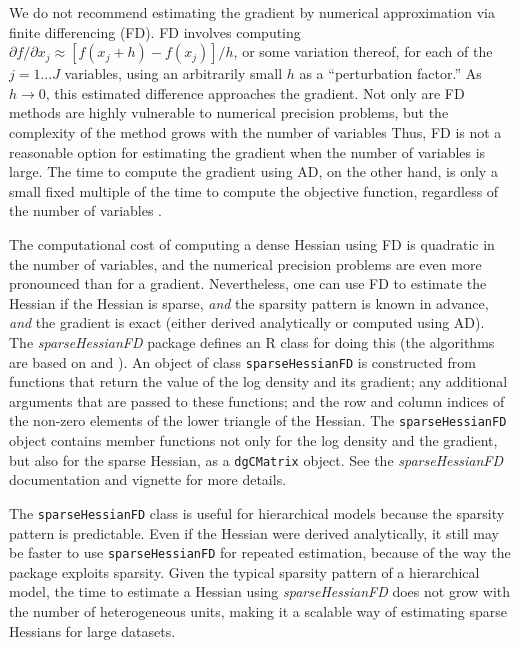 \documentclass[10pt]{article}\usepackage[]{graphicx}\usepackage[]{color}
\newcommand{\pkg}[1]{\emph{#1}}
\newcommand{\proglang}[1]{\textsf{#1}}
\newcommand{\class}[1]{\texttt{#1}}
\begin{document}
We do not recommend estimating the gradient by numerical approximation via finite
differencing (FD).  FD involves computing
$\partial f/\partial x_j\approx\left[f\left(x_j+h\right)-f\left(x_j\right)\right]/h$,
or some variation thereof, for each of the $j=1...J$ variables,
using an arbitrarily small $h$ as a ``perturbation factor.''  As $h\rightarrow 0$, this estimated
difference approaches the gradient.  Not only are FD methods are highly vulnerable
to numerical precision problems, but the complexity of the method
grows with the number of variables   Thus, FD is not a reasonable
option for estimating the gradient
when the number of variables is large.  The time to compute the
gradient using AD, on the
other hand, is only a small fixed multiple of the time to compute the
objective function, regardless of the number of variables
\citep{GriewankWalther2008}.

The computational cost of computing a dense Hessian using FD is
quadratic in the number of variables, and the numerical precision
problems are even more pronounced than for a gradient.  Nevertheless,
one can use FD to estimate the Hessian if the Hessian is sparse, \emph{and} the
sparsity pattern is known in advance, \emph{and} the gradient is
exact (either derived analytically or computed using AD).  The
\pkg{sparseHessianFD} package defines an \proglang{R} class for doing
this (the algorithms are based on \citet{ColemanGarbow1985} and
\citet{ColemanGarbow1985b}). An object
of class \class{sparseHessianFD} is constructed from
functions that return the value of the log density and its gradient; any additional
arguments that are passed to these functions; and the row
and column indices of the non-zero elements of the lower triangle of
the Hessian.  The \class{sparseHessianFD} object contains member
functions not only for the log density and the gradient, but also for
the sparse Hessian, as a \class{dgCMatrix}
object.  See the \pkg{sparseHessianFD} documentation and vignette for
more details.

The \class{sparseHessianFD} class is useful for
hierarchical models because the
sparsity pattern is predictable.
Even if the Hessian were derived analytically, it still may be faster
to use \class{sparseHessianFD} for
repeated estimation, because of the way the package exploits sparsity.  Given the typical sparsity pattern of a hierarchical model, the time to estimate
a Hessian using \pkg{sparseHessianFD} does not grow with the number of
heterogeneous units, making it a scalable way of
estimating sparse Hessians for large datasets.
\end{document}
